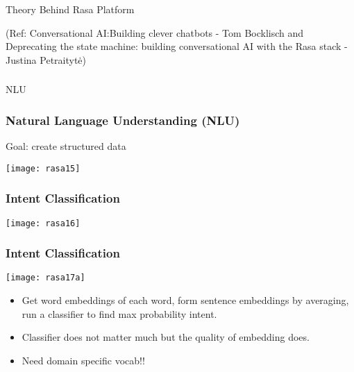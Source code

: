 \begin{frame}[fragile]\frametitle{}
\begin{center}
{\Large Theory Behind Rasa Platform}

{\tiny (Ref: Conversational AI:Building clever chatbots - Tom Bocklisch and Deprecating the state machine: building conversational AI with the Rasa stack - Justina Petraitytė) }

\end{center}
\end{frame}

\begin{frame}[fragile]\frametitle{}
\begin{center}
{\Large NLU}

\end{center}
\end{frame}

\begin{frame}[fragile]\frametitle{Natural Language Understanding (NLU)}

Goal: create structured data

\begin{center}
\texttt{[image: rasa15]}
\end{center}


\end{frame}


\begin{frame}[fragile]\frametitle{Intent Classification}

\begin{center}
\texttt{[image: rasa16]}
\end{center}


\end{frame}

\begin{frame}[fragile]\frametitle{Intent Classification}

\begin{center}
\texttt{[image: rasa17a]}
\end{center}

\begin{itemize}
\item Get word embeddings of each word, form sentence embeddings by averaging, run a classifier to find max probability intent.
\item Classifier does not matter much but the quality of embedding does.
\item Need domain specific vocab!!
\end{itemize}

\end{frame}


